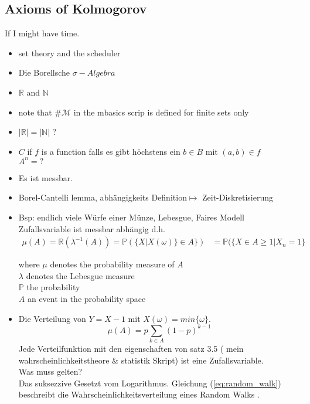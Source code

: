 \subsection{Axioms of Kolmogorov}

 If I might have time. 
 
 \begin{itemize}
 \item set theory and the scheduler
 \item Die Borellsche $\sigma-Algebra$
 \item $\mathbb{R}$ and $\mathbb{N}$
 \item note that $\# \mathcal{M}$ in the mbasics scrip is defined for finite sets only  
 \item $|\mathbb{R}| = | \mathbb{N} |$ ?
 \item $C$ if $f$ is a function  falls es gibt höchstens ein $b\in B$ mit $(a,b)\in f$\\
 		 $A^n = ?$
 \item Es ist messbar.
 \item   Borel-Cantelli lemma, abhängigkeits Definition$\mapsto$ Zeit-Diskretisierung
 \item Bsp: endlich viele Würfe einer Münze, Lebesgue, Faires Modell\\
 		Zufallsvariable ist messbar abhängig d.h. 
 		\begin{align}
 			\mu(A) = \mathbb{R}(\lambda^{-1}(A)) = \mathbb{P} (\{ X| X(\omega)\} \in A \})
 				 & = \mathbb{P}(\{ X \in A \geq 1| X_n = 1 \} 
 		\end{align}  
 		
 		where $\mu$ denotes the probability measure of $A$\\
 		$\lambda$ denotes the Lebesgue measure\\
 		$\mathbb{P}$ the probability\\
 		$A$ an event in the probability space\\
 \item Die Verteilung von $Y = X-1$ mit $X(\omega) = min \{ \omega \}$.
       \begin{equation}\label{eq:random_walk}
       	\mu(A)= p \sum_{k \in A } (1-p) ^{k-1}    	
       	\end{equation}
 		Jede Verteilfunktion mit den eigenschaften von satz 3.5 ( mein wahrscheinlichkeitstheore \& statistik Skript) ist eine Zufallsvariable.\\
 		Was muss gelten?\\
 		Das suksezzive Gesetzt vom Logarithmus.   
   		Gleichung (\ref{eq:random_walk}) beschreibt die Wahrscheinlichkeitsverteilung eines Random Walks . 
 \end{itemize}